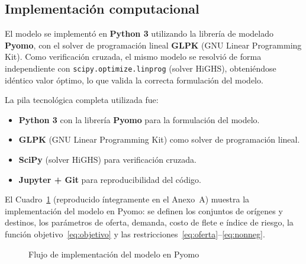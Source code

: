 \documentclass[11pt,a4paper]{article}
\begin{document}
\subsection{Implementaci\'on computacional}
El modelo se implement\'o en \textbf{Python 3} utilizando la librer\'ia de modelado \textbf{Pyomo}, con el solver de programaci\'on lineal \textbf{GLPK} (GNU Linear Programming Kit). Como verificaci\'on cruzada, el mismo modelo se resolvi\'o de forma independiente con \texttt{scipy.optimize.linprog} (solver HiGHS), obteni\'endose id\'entico valor \'optimo, lo que valida la correcta formulaci\'on del modelo.

La pila tecnol\'ogica completa utilizada fue:
\begin{itemize}
  \item \textbf{Python 3} con la librer\'ia \textbf{Pyomo} para la formulaci\'on del modelo.
  \item \textbf{GLPK} (GNU Linear Programming Kit) como solver de programaci\'on lineal.
  \item \textbf{SciPy} (solver HiGHS) para verificaci\'on cruzada.
  \item \textbf{Jupyter + Git} para reproducibilidad del c\'odigo.
\end{itemize}

El Cuadro~\ref{lst:pyomo} (reproducido \'integramente en el Anexo~A) muestra la implementaci\'on del modelo en Pyomo: se definen los conjuntos de or\'igenes y destinos, los par\'ametros de oferta, demanda, costo de flete e \'indice de riesgo, la funci\'on objetivo~\eqref{eq:objetivo} y las restricciones~\eqref{eq:oferta}--\eqref{eq:nonneg}.

\begin{figure}[h]
\centering
{}
\caption{Flujo de implementaci\'on del modelo en Pyomo}
\label{lst:pyomo}
\end{figure}
\end{document}
